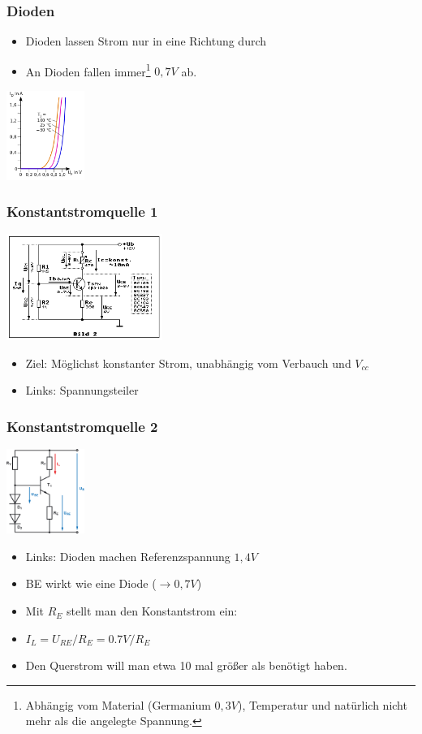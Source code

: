 \documentclass[ngerman,compress]{beamer}
\begin{document}
\begin{frame}
	\frametitle{Dioden}
	\begin{itemize}
		\item Dioden lassen Strom nur in eine Richtung durch
		\item An Dioden fallen immer\footnote{Abhängig vom Material
			(Germanium $0,3V$), Temperatur und natürlich nicht mehr als die angelegte
			Spannung.} $0,7 V$ ab.
	\end{itemize}
	\includegraphics[width=1in]{diod.png}
\end{frame}

\begin{frame}
	\frametitle{Konstantstromquelle 1}
	\includegraphics[width=2in]{konst1.png}
	\begin{itemize}
		\item Ziel: Möglichst konstanter Strom, unabhängig vom Verbauch und
			$V_{cc}$
		\item Links: Spannungsteiler
	\end{itemize}
\end{frame}

\begin{frame}
	\frametitle{Konstantstromquelle 2}
	\includegraphics[width=1in]{konst2.png}
	\begin{itemize}
		\item Links: Dioden machen Referenzspannung $1,4 V$
		\item BE wirkt wie eine Diode ($\rightarrow 0,7 V$)
		\item Mit $R_E$ stellt man den Konstantstrom ein:
		\item $I_L = U_{RE} / R_E = 0.7 V / R_E$
		\item Den Querstrom will man etwa 10 mal größer als benötigt haben.
	\end{itemize}
\end{frame}
\end{document}
